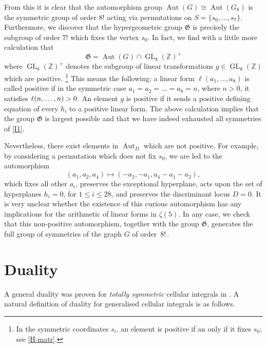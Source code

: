 \documentclass[12pt,reqno]{amsart}
\theoremstyle{remark}
\newcommand\frG{\mathfrak G}
\begin{document}
From this it is clear that  the automorphism group $\operatorname{Aut}(G) \cong \operatorname{Aut}(G_8)$ is  the symmetric group of order $8!$ acting via permutations on $S=\{s_0,\ldots, s_7\}$. Furthermore, we discover  that the hypergeometric group $\frG$ is  precisely the subgroup of order $7!$ which fixes the vertex $s_0$.
In fact, we find  with a little more calculation that 
\[  \frG =  \operatorname{Aut}(G) \cap \operatorname{GL}_8(\mathbb{Z})^+\]
where $\operatorname{GL}_8(\mathbb{Z})^+$ denotes the subgroup of linear transformations $g \in \operatorname{GL}_8(\mathbb{Z})$  which are positive.%
\footnote{In the symmetric coordinates $s_i$,  an element is positive if an only if it fixes $s_0$; see \eqref{H-matr}.}
This means the following: a linear form $\ell(a_1,\dots, a_8)$ is called positive if in the symmetric case $a_1=a_2=\dots= a_8=n$, where $n>0$, it satisfies $\ell(n,\ldots, n)>\nobreak0$. An element $g$ is positive if it sends a positive defining equation of every $h_i$ to a positive linear form. The above calculation implies that  the group $\frG$ is largest possible and that we have indeed exhausted all  symmetries of \eqref{I1}. 
   
  Nevertheless, there exist elements in $\operatorname{Aut}_D$ which are not positive. For example, by considering a permutation which does not fix $s_0$,  we are led to the  automorphism 
   \[ (a_1,a_2,a_4) \mapsto (-a_2, -a_1, a_4-a_1-a_2  ), \]
   which fixes all other $a_i$,  preserves the exceptional hyperplane,   acts upon the set of hyperplanes $h_i=0$, for $1\leq i \leq 28$, and preserves the discriminant locus $D=0$.  It is very unclear whether the existence of this curious automorphism  has any implications for the arithmetic of linear forms in $\zeta(5)$. In any case, we check that this non-positive automorphism, together with the group $\frG$, generates the full group of symmetries of the graph $G$ of order~$8!$\,. 

\section{Duality}
\label{sec-duality}

A general duality  was proven for \emph{totally symmetric} cellular integrals in \cite{Br16}. A natural definition of duality for generalised cellular integrals is as follows.
 
\end{document}
